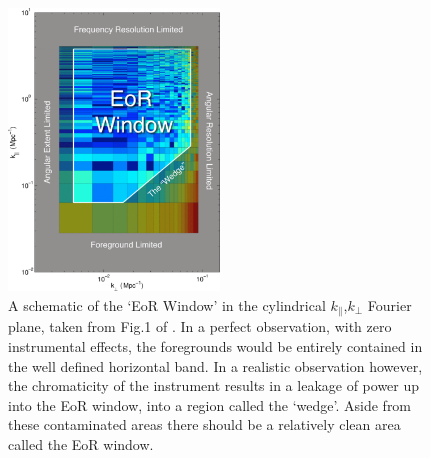 \begin{figure}
\begin{center}
    \includegraphics[width=0.5\textwidth]{medium.png}
\end{center}
    \caption{A schematic of the `EoR Window' in the cylindrical $k_{\parallel}$,$k_{\perp}$ Fourier plane, taken from Fig.1 of \citet{Dillon2014PhRvD..89b3002D}. In a perfect observation, with zero instrumental effects, the foregrounds would be entirely contained in the well defined horizontal band. In a realistic observation however, the chromaticity of the instrument results in a leakage of power up into the EoR window, into a region called the `wedge'. Aside from these contaminated areas there should be a relatively clean area called the EoR window.}
    \label{fig:window_liu}
\end{figure}

